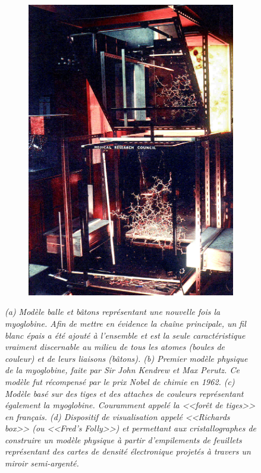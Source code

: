 \begin{figure}
\begin{subfigure}{.5\textwidth}
  {\includegraphics[width=0.9\linewidth]{./figures/ch1/fred_richards_ribonuclease}}
  \caption{}
  \label{Fig:fred_richards_ribonuclease}
  \hspace{0.2cm}
  \end{subfigure}%
  \caption{\it (a) Modèle balle et bâtons représentant une nouvelle fois la myoglobine. Afin de mettre en évidence la chaîne principale, un fil blanc épais a été ajouté à l'ensemble et est la seule caractéristique vraiment discernable au milieu de tous les atomes (boules de couleur) et de leurs liaisons (bâtons).
  (b) Premier modèle physique de la myoglobine, faite par Sir John Kendrew et Max Perutz. Ce modèle fut récompensé par le prix Nobel de chimie en 1962.
  (c) Modèle basé sur des tiges et des attaches de couleurs représentant également la myoglobine. Couramment appelé la <<forêt de tiges>> en français.  
  (d) Dispositif de visualisation appelé <<Richards box>> (ou <<Fred's Folly>>) et permettant aux cristallographes de construire un modèle physique à partir d'empilements de feuillets représentant des cartes de densité électronique projetés à travers un miroir semi-argenté.}
\end{figure}

